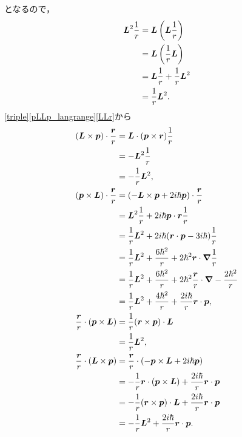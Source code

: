 となるので，
\begin{align}
  \boldsymbol{L}^2\frac{1}{r} & = \boldsymbol{L}\left(\boldsymbol{L}\frac{1}{r}\right)\notag\\
  & = \boldsymbol{L}\left(\frac{1}{r}\boldsymbol{L}\right)\notag\\
  & = \boldsymbol{L}\frac{1}{r} + \frac{1}{r}\boldsymbol{L}^2\notag\\
  & = \frac{1}{r}\boldsymbol{L}^2.\label{LLr}
\end{align}
\eqref{triple}\eqref{pLLp_langrange}\eqref{LLr}から
\begin{align}
  (\boldsymbol{L}\times\boldsymbol{p})\cdot\frac{\boldsymbol{r}}{r}
  & = \boldsymbol{L}\cdot(\boldsymbol{p}\times\boldsymbol{r})\frac{1}{r}\\
  & = - \boldsymbol{L}^2\frac{1}{r}\notag\\
  & = - \frac{1}{r}\boldsymbol{L}^2,\label{Lprr}\\
  (\boldsymbol{p}\times\boldsymbol{L})\cdot\frac{\boldsymbol{r}}{r}
  & = ( - \boldsymbol{L}\times\boldsymbol{p} + 2i\hbar\boldsymbol{p})\cdot\frac{\boldsymbol{r}}{r}\notag\\
  & = \boldsymbol{L}^2\frac{1}{r} + 2i\hbar\boldsymbol{p}\cdot\boldsymbol{r}\frac{1}{r}\notag\\
  & = \frac{1}{r}\boldsymbol{L}^2 + 2i\hbar(\boldsymbol{r}\cdot\boldsymbol{p} - 3i\hbar)\frac{1}{r}\notag\\
  & = \frac{1}{r}\boldsymbol{L}^2 + \frac{6\hbar^2}{r} + 2\hbar^2\boldsymbol{r}\cdot\boldsymbol{\nabla}\frac{1}{r}\notag\\
  & = \frac{1}{r}\boldsymbol{L}^2 + \frac{6\hbar^2}{r} + 2\hbar^2\frac{\boldsymbol{r}}{r}\cdot\boldsymbol{\nabla} - \frac{2\hbar^2}{r}\notag\\
  & = \frac{1}{r}\boldsymbol{L}^2 + \frac{4\hbar^2}{r} + \frac{2i\hbar}{r}\boldsymbol{r}\cdot\boldsymbol{p},\label{pLrr}\\
  \frac{\boldsymbol{r}}{r}\cdot(\boldsymbol{p}\times\boldsymbol{L})
  & = \frac{1}{r}(\boldsymbol{r}\times\boldsymbol{p})\cdot\boldsymbol{L}\notag\\
  & = \frac{1}{r}\boldsymbol{L}^2,\label{rrpL}\\
  \frac{\boldsymbol{r}}{r}\cdot(\boldsymbol{L}\times\boldsymbol{p})
  & = \frac{\boldsymbol{r}}{r}\cdot( - \boldsymbol{p}\times\boldsymbol{L} + 2i\hbar\boldsymbol{p})\notag\\
  & = - \frac{1}{r}\boldsymbol{r}\cdot(\boldsymbol{p}\times\boldsymbol{L}) + \frac{2i\hbar}{r}\boldsymbol{r}\cdot\boldsymbol{p}\notag\\
  & = - \frac{1}{r}(\boldsymbol{r}\times\boldsymbol{p})\cdot\boldsymbol{L} + \frac{2i\hbar}{r}\boldsymbol{r}\cdot\boldsymbol{p}\notag\\
  & = - \frac{1}{r}\boldsymbol{L}^2 + \frac{2i\hbar}{r}\boldsymbol{r}\cdot\boldsymbol{p}.\label{rrLp}
\end{align}
